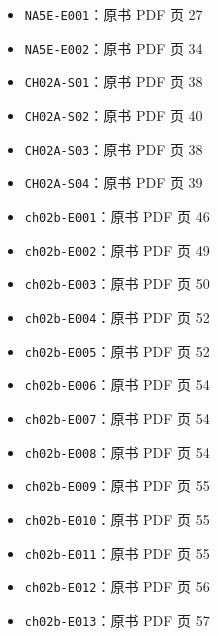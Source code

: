 \documentclass[
  10pt,
  fontset=fandol]{ctexart}
\providecommand{\tightlist}{%
  \setlength{\itemsep}{0pt}\setlength{\parskip}{0pt}}
\begin{document}
\begin{itemize}
\tightlist
\item
  \texttt{NA5E-E001}：原书 PDF 页 27
\item
  \texttt{NA5E-E002}：原书 PDF 页 34
\item
  \texttt{CH02A-S01}：原书 PDF 页 38
\item
  \texttt{CH02A-S02}：原书 PDF 页 40
\item
  \texttt{CH02A-S03}：原书 PDF 页 38
\item
  \texttt{CH02A-S04}：原书 PDF 页 39
\item
  \texttt{ch02b-E001}：原书 PDF 页 46
\item
  \texttt{ch02b-E002}：原书 PDF 页 49
\item
  \texttt{ch02b-E003}：原书 PDF 页 50
\item
  \texttt{ch02b-E004}：原书 PDF 页 52
\item
  \texttt{ch02b-E005}：原书 PDF 页 52
\item
  \texttt{ch02b-E006}：原书 PDF 页 54
\item
  \texttt{ch02b-E007}：原书 PDF 页 54
\item
  \texttt{ch02b-E008}：原书 PDF 页 54
\item
  \texttt{ch02b-E009}：原书 PDF 页 55
\item
  \texttt{ch02b-E010}：原书 PDF 页 55
\item
  \texttt{ch02b-E011}：原书 PDF 页 55
\item
  \texttt{ch02b-E012}：原书 PDF 页 56
\item
  \texttt{ch02b-E013}：原书 PDF 页 57
\end{itemize}
\end{document}
